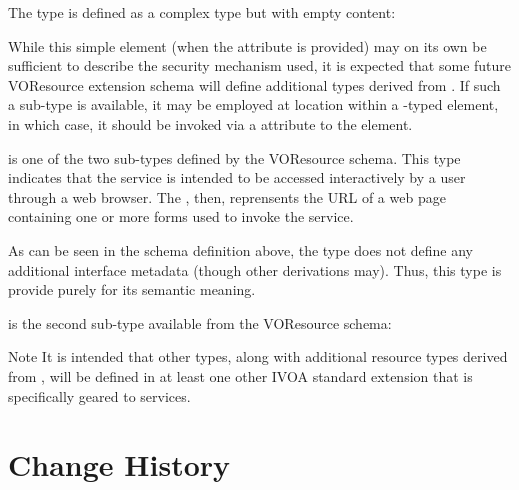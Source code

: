 \documentclass[11pt,a4paper]{ivoa}
\begin{document}


The  type is
defined as a complex type but with empty content:



While this simple element (when the  attribute
is provided) may on its own be sufficient to describe the security
mechanism used, it is expected that some future
VOResource extension schema will define
additional types derived from .  If such
a sub-type is available, it may be employed at
 location within a
-typed element, in which case, it should be
invoked via a  attribute to the
 element.  


 is one of the two 
sub-types defined by the VOResource schema.  This type indicates that
the service is intended to be accessed interactively by a user through
a web browser.  The , then, reprensents
the URL of a web page containing one or more forms used to invoke the
service. 




As can be seen in the schema definition above, the
 type does not define any additional
interface metadata (though other  derivations
may).  Thus, this type is provide purely for its semantic meaning.  



 is the second 
sub-type available from the VOResource schema:



\begin{admonition}{Note}
It is intended that other  types,
along with additional resource types derived from
, will be defined in at least one other
IVOA standard extension that is specifically geared to
services.  
\end{admonition}

\appendix

\section{Change History}
\end{document}
